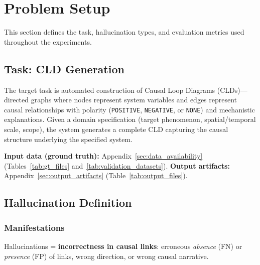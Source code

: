 \section{Problem Setup}
\label{sec:problem_setup}

This section defines the task, hallucination types, and evaluation metrics used throughout the experiments.

\subsection{Task: CLD Generation}
\label{sec:task_cld_generation}

The target task is automated construction of Causal Loop Diagrams (CLDs)---directed graphs where nodes represent system variables and edges represent causal relationships with polarity (\texttt{POSITIVE}, \texttt{NEGATIVE}, or \texttt{NONE}) and mechanistic explanations. Given a domain specification (target phenomenon, spatial/temporal scale, scope), the system generates a complete CLD capturing the causal structure underlying the specified system.

\textbf{Input data (ground truth):} Appendix~\ref{sec:data_availability} (Tables~\ref{tab:gt_files} and~\ref{tab:validation_datasets}). \textbf{Output artifacts:} Appendix~\ref{sec:output_artifacts} (Table~\ref{tab:output_files}).

\subsection{Hallucination Definition}
\label{sec:hallucination_definition}

\subsubsection{Manifestations}
Hallucinations = \textbf{incorrectness in causal links}: erroneous \textit{absence} (FN) or \textit{presence} (FP) of links, wrong direction, or wrong causal narrative.

